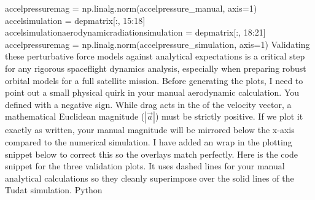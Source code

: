 {}
\markdownRendererSectionEnd \markdownRendererSectionBegin
{}\markdownRendererInterblockSeparator
{}accelpressuremag = np.linalg.norm(accelpressure_manual, axis=1)\markdownRendererInterblockSeparator
{}
\markdownRendererSectionEnd \markdownRendererSectionBegin
{}\markdownRendererInterblockSeparator
{}accelsimulation = depmatrix[:, 15:18] accelsimulationaerodynamicradiationsimulation = depmatrix[:, 18:21] accelpressuremag = np.linalg.norm(accelpressure_simulation, axis=1)\markdownRendererInterblockSeparator
{}\markdownRendererSectionBegin
{}\markdownRendererInterblockSeparator
{}Validating these perturbative force models against analytical expectations is a critical step for any rigorous spaceflight dynamics analysis, especially when preparing robust orbital models for a full satellite mission.\markdownRendererInterblockSeparator
{}Before generating the plots, I need to point out a small physical quirk in your manual aerodynamic calculation. You defined  with a negative sign. While drag acts in the  of the velocity vector, a mathematical Euclidean magnitude ($| \vec{a} |$) must be strictly positive. If we plot it exactly as written, your manual magnitude will be mirrored below the x-axis compared to the numerical simulation. I have added an  wrap in the plotting snippet below to correct this so the overlays match perfectly.\markdownRendererInterblockSeparator
{}Here is the code snippet for the three validation plots. It uses dashed lines for your manual analytical calculations so they cleanly superimpose over the solid lines of the Tudat simulation.\markdownRendererInterblockSeparator
{}Python\markdownRendererInterblockSeparator
{}\markdownRendererInterblockSeparator
